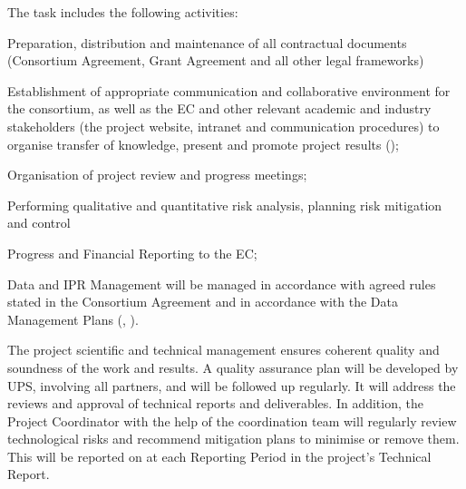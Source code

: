 \begin{workpackage}
\begin{wpdescription}
\end{wpdescription}

\begin{tasklist}

\begin{task}[
  title=Administrative Management,
  id=admin,
  lead=SRL,
  PM=24,
  wphases={0-48},
  partners={CDS,EGI,EP,INSERM,QS,UIO,UPSUD,SIL,WTT,XFEL}
]
The task includes the following activities:
\begin{compactenum}
\item Preparation, distribution and maintenance of all contractual documents (Consortium Agreement, Grant Agreement and all other legal frameworks)
\item Establishment of appropriate communication and collaborative environment for the consortium, as well as the EC and other relevant academic and industry stakeholders (the project website, intranet and communication procedures) to organise transfer of knowledge, present and promote project results ();
\item Organisation of project review and progress meetings;
\item Performing qualitative and quantitative risk analysis, planning risk mitigation and control
\item Progress and Financial Reporting to the EC;
\item Data and IPR Management will be managed in accordance with agreed rules stated in the Consortium Agreement and in accordance with the Data Management Plans (, ).
\end{compactenum}
\end{task}

\begin{task}[
  title=Technical Project Management,
  id=project-management,
  lead=SRL,
  PM=24,
  wphases={0-48},
  partners={CDS,EGI,EP,INSERM,QS,UIO,UPSUD,SIL,WTT,XFEL}
]
The project scientific and technical management ensures coherent quality and soundness of the work and results. A quality assurance plan will be developed by UPS, involving all partners, and will be followed up regularly. It will address the reviews and approval of technical reports and deliverables. In addition, the Project Coordinator with the help of the coordination team will regularly review technological risks and recommend mitigation plans to minimise or remove them. This will be reported on at each Reporting Period in the project's Technical Report.
\end{task}


\end{tasklist}
\end{workpackage}
